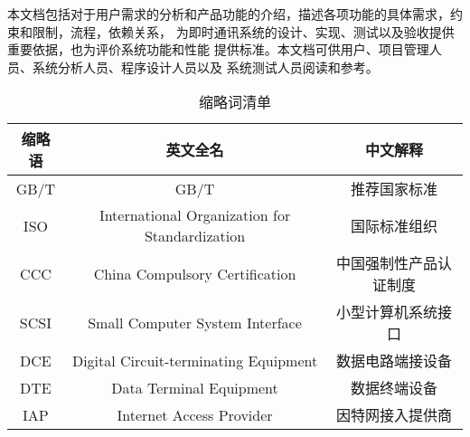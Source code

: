     本文档包括对于用户需求的分析和产品功能的介绍，描述各项功能的具体需求，约束和限制，流程，依赖关系，
    为即时通讯系统的设计、实现、测试以及验收提供重要依据，也为评价系统功能和性能
    提供标准。本文档可供用户、项目管理人员、系统分析人员、程序设计人员以及
    系统测试人员阅读和参考。
\begin{table}[htbp]
    \centering
        \caption{缩略词清单} \label{tab:classification}
        \begin{tabular}{|c|c|c|}
            \hline%
            缩略语                   & 英文全名                 & 中文解释 \\
            \hline%
            GB/T                    & GB/T                  & 推荐国家标准 \\
            \hline%
            ISO & International Organization for Standardization  & 国际标准组织 \\
            \hline%
            CCC & China Compulsory Certification  & 中国强制性产品认证制度 \\
            \hline%
            SCSI & Small Computer System Interface  & 小型计算机系统接口 \\
            \hline%
            DCE & Digital Circuit-terminating Equipment  & 数据电路端接设备 \\
            \hline%
            DTE & Data Terminal Equipment  & 数据终端设备 \\
            \hline%
            IAP & Internet Access Provider  & 因特网接入提供商 \\
            \hline%
    \end{tabular}
\end{table}

